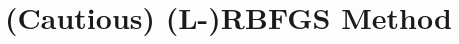 \documentclass[9.4pt]{beamer}
\begin{document}

\section{(Cautious) (L-)RBFGS Method}
\end{document}

